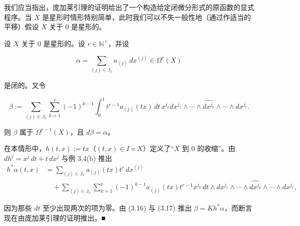 我们应当指出，庞加莱引理的证明给出了一个构造给定闭微分形式的原函数的显式程序。当 $ X $ 是星形时情形特别简单，此时我们可以不失一般性地（通过作适当的平移）假设 $ X $ 关于 $ 0 $ 是星形的。

\begin{corollary}

设 $ X $ 关于 $ 0 $ 是星形的。设 $ r \in \mathbb{N}^{\times} $，并设

\[
\alpha = \sum_{(j)\in\mathbb{J}_{r}} a_{(j)}\, dx^{(j)} \in \Omega^{r}(X)
\]

是闭的。又令

\begin{equation}
\beta := \sum_{(j)\in\mathbb{J}_{r}} \sum_{k=1}^{r} (-1)^{k-1} \int_{0}^{1} t^{r-1} a_{(j)}(tx)\, dt\, x^{j_{k}} dx^{j_{1}} \wedge \cdots \wedge \widehat{dx^{j_{k}}} \wedge \cdots \wedge dx^{j_{r}}.\tag{3.19}
\end{equation}

则 $ \beta $ 属于 $ \Omega^{r-1}(X) $，且 $ d\beta = \alpha $。

\proofhead
在本情形中，$ h(t, x) := tx $（$ (t, x) \in I \times X $）定义了“$ X $ 到 $ 0 $ 的收缩”。由 $ dh^{j} = x^{j}\, dt + t\, dx^{j} $ 与例 3.4(b) 推出
\begin{equation*}
\begin{aligned}
h^{\ast}\alpha(t, x) &= \sum_{(j)\in\mathbb{J}_{r}} a_{(j)}(tx) t^{r}\, dx^{(j)} \\ &\quad + \sum_{(j)\in\mathbb{J}_{r}} \sum_{k=1}^{r} (-1)^{k-1} a_{(j)}(tx) t^{r-1} x^{j_{k}}\, dt \wedge dx^{j_{1}} \wedge \cdots \wedge \widehat{dx^{j_{k}}} \wedge \cdots \wedge dx^{j_{r}},
\end{aligned}
\end{equation*}

因为那些 $ dt $ 至少出现两次的项为零。由 (3.16) 与 (3.17) 推出 $ \beta = Kh^{\ast}\alpha $，而断言现在由庞加莱引理的证明推出。\nobreak\hspace{0.35em}■

\end{corollary}

